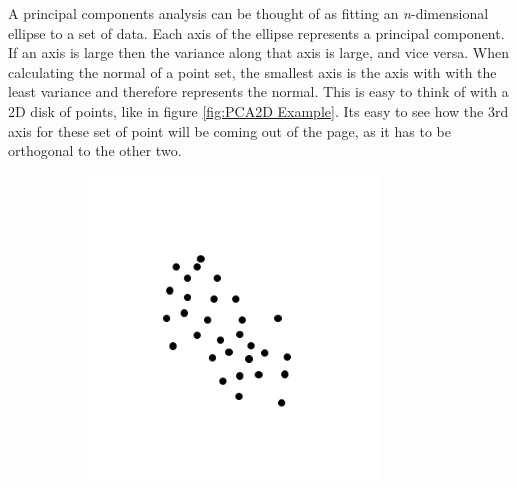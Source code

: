 		A principal components analysis can be thought of as fitting an \textit{n}-dimensional ellipse to a set of data. Each axis of the ellipse represents a principal component. If an axis is large then the variance along that axis is large, and vice versa. When calculating the normal of a point set, the smallest axis is the axis with with the least variance and therefore represents the normal. This is easy to think of with a 2D disk of points, like in figure \ref{fig:PCA2D Example}. Its easy to see how the 3rd axis for these set of point will be coming out of the page, as it has to be orthogonal to the other two.
		
		\begin{figure}[H]
			\centering
			\begin{subfigure}{.5\textwidth}
				\centering
				\includegraphics[width=1\linewidth]{Includes/images/pca1}


\end{subfigure}
\end{figure}
